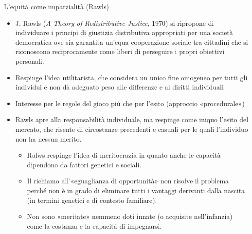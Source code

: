 \documentclass[aspectratio=64,11pt]{beamer}
\begin{document}
\begin{frame}{L'equità come imparzialità (Rawls)}
\begin{itemize}
\item J. Rawls (\emph{A Theory of Redistributive Justice}, 1970) si ripropone di
  individuare i principi di giustizia distributiva appropriati per una società
  democratica ove sia garantita un'equa cooperazione sociale tra cittadini che
  si riconoscono reciprocamente come liberi di perseguire i propri obiettivi
  personali.
\item Respinge l'idea utilitarista, che considera un unico fine omogeneo per tutti
gli individui e non dà adeguato peso alle differenze e ai diritti individuali
\item Interesse per le regole del gioco più che per l'esito (approccio
«procedurale»)
\item Rawls apre alla responsabilità individuale, ma respinge come iniquo l'esito
del mercato, che risente di circostanze precedenti e casuali per le quali
l'individuo non ha nessun merito.
\begin{itemize}
\item Ralws respinge l'idea di \alert{meritocrazia} in quanto anche le capacità
dipendono da fattori genetici e sociali.
\item Il richiamo all'«eguaglianza di opportunità» non risolve il problema
perché non è in grado di eliminare tutti i vantaggi derivanti dalla
nascita (in termini genetici e di contesto familiare).
\item Non sono «meritate» nemmeno doti innate (o acquisite nell'infanzia) come
  la costanza e la capacità di impegnarsi.
\end{itemize}
\end{itemize}
\end{frame}
\end{document}
